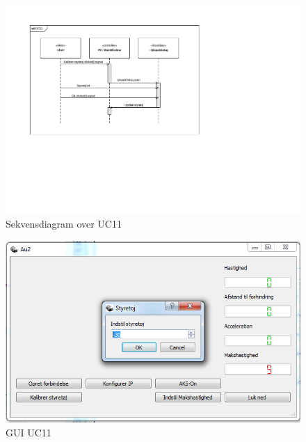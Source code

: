 \begin{figure}[H]
\centering
\includegraphics[width=\textwidth* 2/3,height=\textwidth* 4/10 ]{../fig/diagrammer/pc/sd_uc11.pdf}
\caption{Sekvensdiagram over UC11}
\label{fig:cd_uc11}
\end{figure}

\begin{figure}[H]
\centering
\includegraphics[width=\textwidth* 3/4,height=\textwidth* 9/20 ]{../fig/billeder/gui_uc11.png}
\caption{GUI UC11}
\label{fig:GUI_uc11}
\end{figure}

